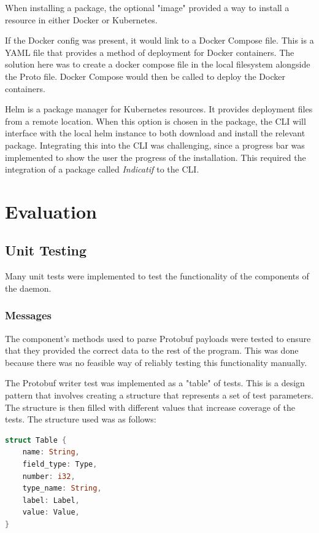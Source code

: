 \documentclass[a4paper,12pt]{report}
\begin{document}
When installing a package, the optional "image" provided a way to install a resource in either Docker or Kubernetes.

If the Docker config was present, it would link to a Docker Compose \cite{compose} file. This is a YAML file that provides a method of deployment for Docker containers. The solution here was to create a docker compose file in the local filesystem alongside the Proto file. Docker Compose would then be called to deploy the Docker containers.

Helm \cite{helm} is a package manager for Kubernetes resources. It provides deployment files from a remote location.
When this option is chosen in the package, the CLI will interface with the local helm instance to both download and install the relevant package.
Integrating this into the CLI was challenging, since a progress bar was implemented to show the user the progress of the installation.
This required the integration of a package called \textit{Indicatif \cite{indicatif}} to the CLI.

\chapter{Evaluation}
\section{Unit Testing}
Many unit tests were implemented to test the functionality of the components of the daemon.

\subsection{Messages}
The \textit{} component's methods used to parse Protobuf payloads were tested to ensure that they provided the correct
data to the rest of the program. This was done because there was no feasible way of reliably testing this functionality manually.

The Protobuf writer test was implemented as a "table" of tests. This is a design pattern that involves creating a structure that represents a set of test parameters. The structure is then filled with different values that increase coverage of the tests.
The structure used was as follows:

\begin{lstlisting}[language=Rust]
struct Table {
    name: String,
    field_type: Type,
    number: i32,
    type_name: String,
    label: Label,
    value: Value,
}
\end{lstlisting}
\end{document}

